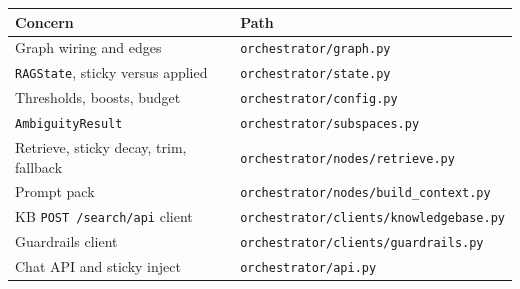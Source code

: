 \begin{longtable}[]{@{}
  >{\raggedright\arraybackslash}p{}
  >{\raggedright\arraybackslash}p{}@{}}
\toprule\noalign{}
Concern & Path \\
\midrule\noalign{}
\endhead
\bottomrule\noalign{}
\endlastfoot
Graph wiring and edges & \texttt{orchestrator/graph.py} \\
\texttt{RAGState}, sticky versus applied & \texttt{orchestrator/state.py} \\
Thresholds, boosts, budget & \texttt{orchestrator/config.py} \\
\texttt{AmbiguityResult} & \texttt{orchestrator/subspaces.py} \\
Retrieve, sticky decay, trim, fallback & \texttt{orchestrator/nodes/retrieve.py} \\
Prompt pack & \texttt{orchestrator/nodes/build\_context.py} \\
KB \texttt{POST\ /search/api} client & \texttt{orchestrator/clients/knowledgebase.py} \\
Guardrails client & \texttt{orchestrator/clients/guardrails.py} \\
Chat API and sticky inject & \texttt{orchestrator/api.py} \\
\end{longtable}
